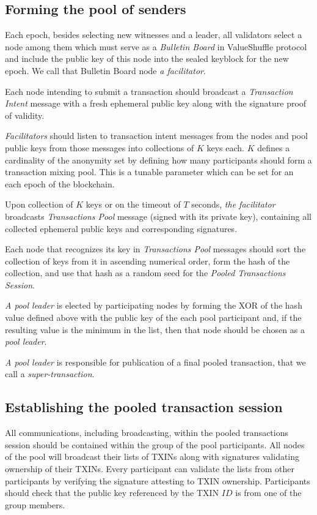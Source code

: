 \documentclass[a4paper, 10pt, conference]{ieeeconf}
\begin{document}
\subsection{Forming the pool of senders}
Each epoch, besides selecting new witnesses and a leader, all validators select a node among them which must serve as a \textit{Bulletin Board} in ValueShuffle protocol and include the public key of this node into the sealed keyblock for the new epoch. We call that Bulletin Board node \textit{a facilitator}.

Each node intending to submit a transaction should broadcast a \textit{Transaction Intent} message with a fresh ephemeral public key along with the signature proof of validity.

\textit{Facilitators} should listen to transaction intent messages from the nodes and pool public keys from those messages into collections of $K$ keys each. $K$ defines a cardinality of the anonymity set by defining how many participants should form a transaction mixing pool. This is a tunable parameter which can be set for an each epoch of the blockchain. 

Upon collection of $K$ keys or on the timeout of $T$ seconds, \textit{the facilitator} broadcasts \textit{Transactions Pool} message (signed with its private key), containing all collected ephemeral public keys and corresponding signatures.

Each node that recognizes its key in \textit{Transactions Pool} messages should sort the collection of keys from it in ascending numerical order, form the hash of the collection, and use that hash as a random seed for the \textit{Pooled Transactions Session}.

\textit{A pool leader} is elected by participating nodes by forming the XOR of the hash value defined above with the public key of the each pool participant and, if the resulting value is the minimum in the list, then that node should be chosen as a \textit{pool leader}.

\textit{A pool leader} is responsible for publication of a final pooled transaction, that we call a \textit{super-transaction}.

\subsection{Establishing the pooled transaction session}
All communications, including broadcasting, within the pooled transactions session should be contained within the group of the pool participants. All nodes of the pool will broadcast their lists of TXINs along with signatures validating ownership of their TXINs. Every participant can validate the lists from other participants by verifying the signature attesting to TXIN ownership. Participants should check that the public key referenced by the TXIN $ID$ is from one of the group members.
\end{document}
